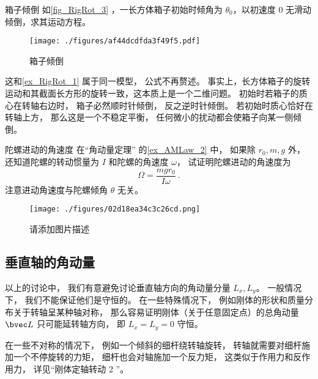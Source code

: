 \begin{example}{箱子倾倒}
如\autoref{fig_RigRot_3} ，一长方体箱子初始时倾角为 $\theta_0$，以初速度 0 无滑动倾倒，求其运动方程。
\begin{figure}[ht]
\centering
\texttt{[image: ./figures/af44dcdfda3f49f5.pdf]}
\caption{箱子倾倒} \label{fig_RigRot_3}
\end{figure}
这和\autoref{ex_RigRot_1} 属于同一模型， 公式不再赘述。 事实上，长方体箱子的旋转运动和其截面长方形的旋转一致，这本质上是一个二维问题。 初始时若箱子的质心在转轴右边时， 箱子必然顺时针倾倒， 反之逆时针倾倒。 若初始时质心恰好在转轴上方， 那么这是一个不稳定平衡， 任何微小的扰动都会使箱子向某一侧倾倒。
\end{example}

\begin{exercise}{陀螺进动的角速度}\label{exe_RigRot_1}
在“角动量定理” 的\autoref{ex_AMLaw_2} 中， 如果除 $r_0, m, g$ 外， 还知道陀螺的转动惯量为 $I$ 和陀螺的角速度 $\omega$， 试证明陀螺进动的角速度为
\begin{equation}
\Omega = \frac{mgr_0}{I\omega}~.
\end{equation}
注意进动角速度与陀螺倾角 $\theta$ 无关。
\end{exercise}

\begin{example}{}\label{ex_RigRot_2}
\begin{figure}[ht]
\centering
\texttt{[image: ./figures/02d18ea34c3c26cd.png]}
\caption{请添加图片描述} \label{fig_RigRot_4}
\end{figure}
\end{example}

\subsection{垂直轴的角动量}
以上的讨论中， 我们有意避免讨论垂直轴方向的角动量分量 $L_x, L_y$。 一般情况下， 我们不能保证他们是守恒的。 在一些特殊情况下， 例如刚体的形状和质量分布关于转轴呈某种轴对称， 那么容易证明刚体（关于任意固定点）的总角动量 $\bvec L$ 只可能延转轴方向， 即 $L_x = L_y = 0$ 守恒。 %

在一些不对称的情况下， 例如一个倾斜的细杆绕转轴旋转， %
转轴就需要对细杆施加一个不停旋转的力矩， 细杆也会对轴施加一个反力矩， 这类似于作用力和反作用力， 详见“刚体定轴转动 2 ”。
